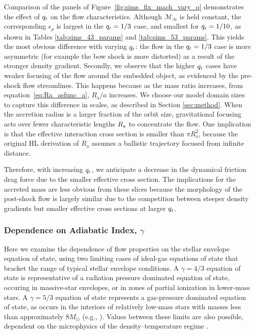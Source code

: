 Comparison of the panels of Figure~\ref{fig:sims_fix_mach_vary_q} demonstrates the effect of $q_{\rm r}$ on the flow characteristics. 
Although $\mathcal{M}_\infty$ is held constant, the corresponding $\epsilon_\rho$ is largest in the $q_{\rm r} = 1/3$ case, and smallest for $q_{\rm r} = 1/10$, as shown in Tables \ref{tab:sims_43_params} and \ref{tab:sims_53_params}. This yields the most obvious difference with varying $q_{\rm r}$: the flow in the $q_{\rm r}=1/3$ case is more asymmetric (for example the bow shock is more distorted) as a result of the stronger density gradient. Secondly, we observe that the higher $q_{\rm r}$ cases have weaker focusing of the flow around the embedded object, as evidenced by the pre-shock flow streamlines. This happens because as the mass ratio increases, from equation~\eqref{eq:Ra_asfunc_a}, $R_{\mathrm a}/a$ increases. We choose our model domain sizes to capture this difference in scales, as described in Section \ref{sec:method}. When the accretion radius is a larger fraction of the orbit size, gravitational focusing acts over fewer characteristic lengths $R_{\rm a}$ to concentrate the flow. One implication is that the effective interaction cross section is smaller than $\pi R_{\mathrm{a}}^2$, because the original HL derivation of $R_{\mathrm{a}}$ assumes a ballistic trajectory focused from infinite distance. 

Therefore, with increasing $q_{\rm r}$, we anticipate a decrease in the dynamical friction drag force due to the smaller effective cross section. The implications for the accreted mass are less obvious from these slices because the morphology of the post-shock flow is largely similar due to the competition between steeper density gradients but smaller effective cross sections at larger $q_{\rm r}$. 

\subsubsection{Dependence on Adiabatic Index, $\gamma$}\label{sec:hydro_gamma}

Here we examine the dependence of flow properties on the stellar envelope equation of state, using two limiting cases of ideal-gas equations of state that bracket the range of typical stellar envelope conditions. 
A $\gamma=4/3$ equation of state is representative of a radiation pressure dominated equation of state, occuring in massive-star envelopes, or in zones of partial ionization in lower-mass stars. A $\gamma=5/3$ equation of state represents a gas-pressure dominated equation of state, as occurs in the interiors of relatively low-mass stars with masses less than approximately $ 8 M_\odot$ (e.g., \cite{MacLeod:2017,Murguia-Berthier:2017}). Values between these limits are also possible, dependent on the microphysics of the density--temperature regime \cite{Murguia-Berthier:2017}.

